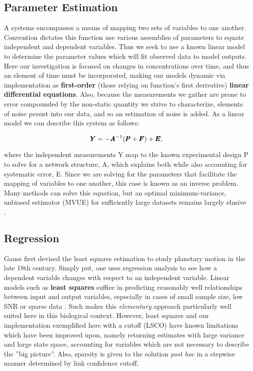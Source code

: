 \subsection{Parameter Estimation}
\label{sec:parest}
A systems encompasses a means of mapping two sets of variables to one another. Convention dictates this function use various assemblies of parameters to equate independent and dependent variables. Thus we seek to use a known linear model to determine the parameter values which will fit observed data to model outputs. Here our investigation is focused on changes in concentrations over time, and thus an element of time must be incorporated, making our models dynamic via implementation as \textbf{first-order} (those relying on function's first derivative) \textbf{linear differential equations}. Also, because the measurements we gather are prone to error compounded by the non-static quantity we strive to characterize, elements of noise persist into our data, and so an estimation of noise is added. As a linear model we can describe this system as follows:

\begin{equation}
\label{eq:Linearmap}
  {\pmb{Y}} = -{\pmb{A}}^{-1}({\pmb{P}}+{\pmb{F}})+ {\pmb{E}},
\end{equation}

where the independent measurements Y map to the known experimental design P to solve for a network structure, A, which explains both while also accounting for systematic error, E. Since we are solving for the parameters that facilitate the mapping of variables to one another, this case is known as an inverse problem. Many methods can solve this equation, but an optimal minimum-variance, unbiased estimator (MVUE) for sufficiently large datasets remains largely elusive \citep{kay1993fundamentals}. 



\subsection{Regression}
\label{sec:regress}
Gauss first devised the least squares estimation to study planetary motion in the late 18th century. Simply put, one uses regression analysis to see how a dependent variable changes with respect to an independent variable. Linear models such as \textbf{least squares} suffice in predicting reasonably well relationships between input and output variables, especially in cases of small sample size, low SNR or sparse data \cite[p.43]{friedman2001elements}. Such makes this \emph{elementary} approach particularly well suited here in this biological context. However, least squares and our implementation exemplified here with a cutoff (LSCO) have known limitations which have been improved upon, namely returning estimates with large variance and large state space, \ie accounting for variables which are not necessary to describe the ''big picture''\cite[p.57]{friedman2001elements}. Also, sparsity is given to the solution \emph{post hoc} in a stepwise manner determined by link confidence cutoff.

